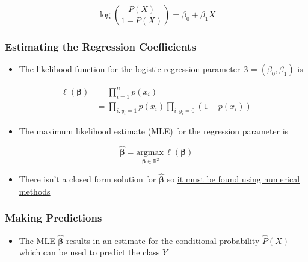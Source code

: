 \documentclass[11pt]{article}
\providecommand{\tightlist}{%
      \setlength{\itemsep}{0pt}\setlength{\parskip}{0pt}}
\begin{document}
\[\log\left(\frac{P(X)}{1 - P(X)}\right) = \beta_0 + \beta_1 X\]

    \hypertarget{estimating-the-regression-coefficients}{%
\subsubsection{Estimating the Regression
Coefficients}\label{estimating-the-regression-coefficients}}

    \begin{itemize}
\tightlist
\item
  The likelihood function for the logistic regression parameter
  \(\boldsymbol{\beta} = (\beta_0, \beta_1)\) is
\end{itemize}

\begin{align*}
\ell(\boldsymbol{\beta}) &= \prod_{i = 1}^n p(x_i)\\
&= \prod_{i: y_i = 1}p(x_i) \prod_{i: y_i = 0} (1 - p(x_i))
\end{align*}

\begin{itemize}
\tightlist
\item
  The maximum likelihood estimate (MLE) for the regression parameter is
\end{itemize}

\[ \hat{\boldsymbol{\beta}} = \underset{\boldsymbol{\beta}\in \mathbb{R}^2}{\text{argmax}\,} \ell(\boldsymbol{\beta})\]

\begin{itemize}
\tightlist
\item
  There isn't a closed form solution for \(\hat{\boldsymbol{\beta}}\) so
  \href{https://en.wikipedia.org/wiki/Logistic_regression\#Maximum_likelihood_estimation}{it
  must be found using numerical methods}
\end{itemize}

    \hypertarget{making-predictions}{%
\subsubsection{Making Predictions}\label{making-predictions}}

    \begin{itemize}
\tightlist
\item
  The MLE \(\hat{\boldsymbol{\beta}}\) results in an estimate for the
  conditional probability \(\hat{P}(X)\) which can be used to predict
  the class \(Y\)
\end{itemize}
\end{document}
